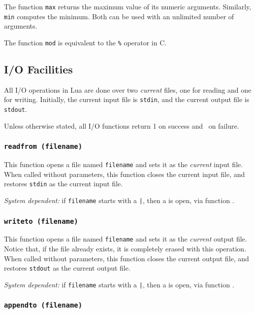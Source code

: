 The function \verb'max' returns the maximum
value of its numeric arguments.
Similarly, \verb'min' computes the minimum.
Both can be used with an unlimited number of arguments.

The function \verb'mod' is equivalent to the \verb'%' operator in C.


\subsection{I/O Facilities} \label{libio}

All I/O operations in Lua are done over two {\em current} files,
one for reading and one for writing.
Initially, the current input file is \verb'stdin',
and the current output file is \verb'stdout'.

Unless otherwise stated,
all I/O functions return 1 on success and \nil\ on failure.

\subsubsection*{{\tt readfrom (filename)}}

This function opens a file named \verb'filename' and sets it as the
{\em current} input file.
When called without parameters,
this function closes the current input file,
and restores \verb'stdin' as the current input file.

{\em System dependent:} if \verb'filename' starts with a \verb'|',
then a  is open, via function .

\subsubsection*{{\tt writeto (filename)}}

This function opens a file named \verb'filename' and sets it as the
{\em current} output file.
Notice that, if the file already exists, it is completely erased with this
operation.
When called without parameters,
this function closes the current output file,
and restores \verb'stdout' as the current output file.

{\em System dependent:} if \verb'filename' starts with a \verb'|',
then a  is open, via function .

\subsubsection*{{\tt appendto (filename)}}

